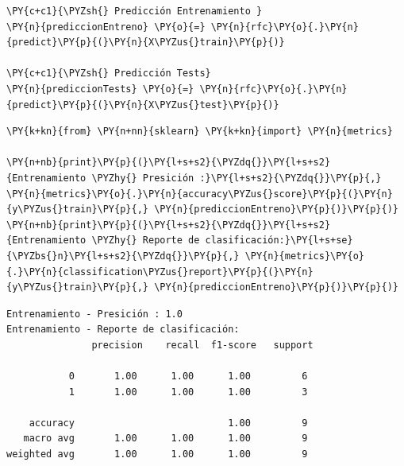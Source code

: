     \begin{tcolorbox}[breakable, size=fbox, boxrule=1pt, pad at break*=1mm,colback=cellbackground, colframe=cellborder]
\begin{Verbatim}[commandchars=\\\{\}]
\PY{c+c1}{\PYZsh{} Predicción Entrenamiento }
\PY{n}{prediccionEntreno} \PY{o}{=} \PY{n}{rfc}\PY{o}{.}\PY{n}{predict}\PY{p}{(}\PY{n}{X\PYZus{}train}\PY{p}{)}

\PY{c+c1}{\PYZsh{} Predicción Tests}
\PY{n}{prediccionTests} \PY{o}{=} \PY{n}{rfc}\PY{o}{.}\PY{n}{predict}\PY{p}{(}\PY{n}{X\PYZus{}test}\PY{p}{)}
\end{Verbatim}
\end{tcolorbox}

    \begin{tcolorbox}[breakable, size=fbox, boxrule=1pt, pad at break*=1mm,colback=cellbackground, colframe=cellborder]
\begin{Verbatim}[commandchars=\\\{\}]
\PY{k+kn}{from} \PY{n+nn}{sklearn} \PY{k+kn}{import} \PY{n}{metrics}

\PY{n+nb}{print}\PY{p}{(}\PY{l+s+s2}{\PYZdq{}}\PY{l+s+s2}{Entrenamiento \PYZhy{} Presición :}\PY{l+s+s2}{\PYZdq{}}\PY{p}{,} \PY{n}{metrics}\PY{o}{.}\PY{n}{accuracy\PYZus{}score}\PY{p}{(}\PY{n}{y\PYZus{}train}\PY{p}{,} \PY{n}{prediccionEntreno}\PY{p}{)}\PY{p}{)}
\PY{n+nb}{print}\PY{p}{(}\PY{l+s+s2}{\PYZdq{}}\PY{l+s+s2}{Entrenamiento \PYZhy{} Reporte de clasificación:}\PY{l+s+se}{\PYZbs{}n}\PY{l+s+s2}{\PYZdq{}}\PY{p}{,} \PY{n}{metrics}\PY{o}{.}\PY{n}{classification\PYZus{}report}\PY{p}{(}\PY{n}{y\PYZus{}train}\PY{p}{,} \PY{n}{prediccionEntreno}\PY{p}{)}\PY{p}{)}
\end{Verbatim}
\end{tcolorbox}

    \begin{Verbatim}[commandchars=\\\{\}]
Entrenamiento - Presición : 1.0
Entrenamiento - Reporte de clasificación:
               precision    recall  f1-score   support

           0       1.00      1.00      1.00         6
           1       1.00      1.00      1.00         3

    accuracy                           1.00         9
   macro avg       1.00      1.00      1.00         9
weighted avg       1.00      1.00      1.00         9

    \end{Verbatim}


